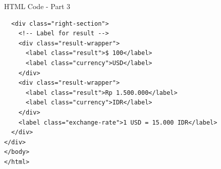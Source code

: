 \documentclass[aspectratio=169, table]{beamer}
\begin{document}
\begin{frame}[fragile]{HTML Code - Part 3}
\begin{verbatim}
  <div class="right-section">
    <!-- Label for result -->
    <div class="result-wrapper">
      <label class="result">$ 100</label>
      <label class="currency">USD</label>
    </div>
    <div class="result-wrapper">
      <label class="result">Rp 1.500.000</label>
      <label class="currency">IDR</label>
    </div>
    <label class="exchange-rate">1 USD = 15.000 IDR</label>
  </div>
</div>
</body>
</html>
\end{verbatim}
\end{frame}

%                 
\end{document}

